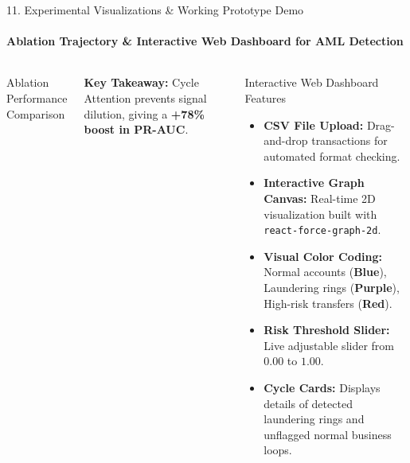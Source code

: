 \documentclass[aspectratio=169, 11pt]{beamer}
\begin{document}
\begin{frame}{11. Experimental Visualizations \& Working Prototype Demo}
    \framesubtitle{Ablation Trajectory \& Interactive Web Dashboard for AML Detection}
    \begin{columns}[T]
        \begin{block}{Ablation Performance Comparison}
            \centering
            \vspace{0.1cm}
        \end{block}
        \vspace{-0.1cm}
        {\scriptsize \textbf{Key Takeaway:} Cycle Attention prevents signal dilution, giving a \textbf{+78\% boost in PR-AUC}.}

        \begin{block}{Interactive Web Dashboard Features}
            \footnotesize
            \begin{itemize}\setlength{\itemsep}{2pt}
                \item \textbf{CSV File Upload:} Drag-and-drop transactions for automated format checking.
                \item \textbf{Interactive Graph Canvas:} Real-time 2D visualization built with \texttt{react-force-graph-2d}.
                \item \textbf{Visual Color Coding:} Normal accounts (\textcolor{deepNavy}{\textbf{Blue}}), Laundering rings (\textcolor{cyclePurple}{\textbf{Purple}}), High-risk transfers (\textcolor{riskRed}{\textbf{Red}}).
                \item \textbf{Risk Threshold Slider:} Live adjustable slider from $0.00$ to $1.00$.
                \item \textbf{Cycle Cards:} Displays details of detected laundering rings and unflagged normal business loops.
            \end{itemize}
        \end{block}
    \end{columns}
\end{frame}
\end{document}
